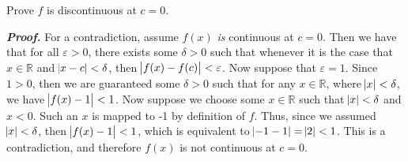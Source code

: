 \documentclass[12pt, a4paper]{article}
\begin{document}
\vspace{2mm}

Prove $f$ is discontinuous at $c=0$.

\begin{description}

    \item\textit{\textbf{Proof.}} For a contradiction, assume $f(x)$ \textit{is} continuous at $c=0$. Then we have that for all $\varepsilon>0$, there exists some $\delta>0$ such that whenever it is the case that $x\in\mathbb{R}$ and $\abs{x-c}<\delta$, then $\abs{f(x)-f(c)}<\varepsilon$. Now suppose that $\varepsilon=1$. Since $1>0$, then we are guaranteed some $\delta>0$ such that for any $x\in\mathbb{R}$, where $\abs{x}<\delta$, we have $\abs{f(x)-1}<1$. Now suppose we choose some $x\in\mathbb{R}$ such that $\abs{x}<\delta$ and $x<0$. Such an $x$ is mapped to -1 by definition of $f$. Thus, since we assumed $\abs{x}<\delta$, then $\abs{f(x)-1}<1$, which is equivalent to $\abs{-1-1}=\abs{2}<1$. This is a contradiction, and therefore $f(x)$ is not continuous at $c=0$.\hspace{114mm}\square
    
    
    
\end{description}
\end{document}
